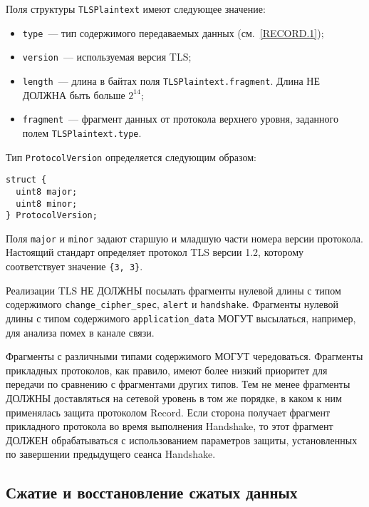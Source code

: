 Поля структуры \lstinline{TLSPlaintext} имеют следующее значение:
\begin{itemize}
\item[--]
\lstinline{type}~--- тип содержимого передаваемых данных (см.~\ref{RECORD.1});

\item[--]
\lstinline{version}~--- используемая версия TLS;

\item[--]
\lstinline{length}~--- длина в байтах поля 
\lstinline{TLSPlaintext.fragment}. Длина НЕ ДОЛЖНА быть больше $2^{14}$; 

\item[--]
\lstinline{fragment}~--- фрагмент данных от протокола верхнего уровня, 
заданного полем \lstinline{TLSPlaintext.type}. 
\end{itemize}

Тип \lstinline{ProtocolVersion} определяется следующим образом:
\begin{lstlisting}
struct {
  uint8 major;
  uint8 minor;
} ProtocolVersion;
\end{lstlisting}

Поля \lstinline{major} и \lstinline{minor} задают старшую и младшую части 
номера версии протокола. Настоящий стандарт определяет протокол TLS версии 
1.2, которому соответствует значение \lstinline|{3, 3}|. 

Реализации TLS НЕ ДОЛЖНЫ посылать фрагменты нулевой длины с типом 
содержимого \lstinline{change_cipher_spec}, \lstinline{alert} и 
\lstinline{handshake}. Фрагменты нулевой длины с типом содержимого 
\lstinline{application_data} МОГУТ высылаться, например, для  
анализа помех в канале связи. 

Фрагменты с различными типами содержимого МОГУТ чередоваться. Фрагменты 
прикладных протоколов, как правило, имеют более низкий приоритет для 
передачи по сравнению с фрагментами других типов. Тем не менее фрагменты 
ДОЛЖНЫ доставляться на сетевой уровень в том же порядке, в каком к ним 
применялась защита протоколом Record. Если сторона получает фрагмент 
прикладного протокола во время выполнения Handshake, то этот фрагмент 
ДОЛЖЕН обрабатываться с использованием параметров защиты, установленных по 
завершении предыдущего сеанса Handshake. 
                                                      
\subsection {Сжатие и восстановление сжатых данных}\label{RECORD.3.2} 

